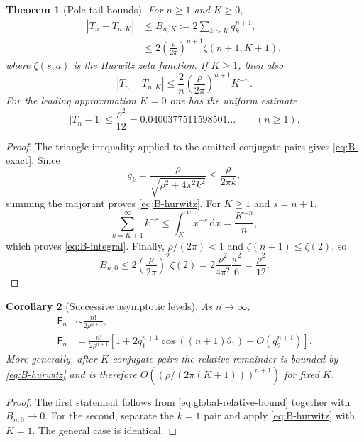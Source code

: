 \documentclass[11pt,a4paper,oneside]{article}
\newtheorem{theorem}{Theorem}[section]
\newtheorem{corollary}[theorem]{Corollary}
\theoremstyle{definition}
\theoremstyle{remark}
\newcommand{\Fub}{\mathsf{F}}
\newcommand{\dd}{\,\mathrm{d}}
\begin{document}
\begin{theorem}[Pole-tail bounds]\label{thm:pole-tail}
For $n\ge1$ and $K\ge0$,
\begin{align}
 |T_n-T_{n,K}|
 &\le B_{n,K}:=2\sum_{k>K}q_k^{n+1},\label{eq:B-exact}\\
 &\le 2\left(\frac{\rho}{2\pi}\right)^{n+1}
       \zeta(n+1,K+1),\label{eq:B-hurwitz}
\end{align}
where $\zeta(s,a)$ is the Hurwitz zeta function.  If $K\ge1$, then also
\begin{equation}\label{eq:B-integral}
 |T_n-T_{n,K}|
 \le \frac{2}{n}\left(\frac{\rho}{2\pi}\right)^{n+1}K^{-n}.
\end{equation}
For the leading approximation $K=0$ one has the uniform estimate
\begin{equation}\label{eq:global-relative-bound}
 |T_n-1|\le\frac{\rho^2}{12}=0.0400377511598501\ldots
 \qquad(n\ge1).
\end{equation}
\end{theorem}

\begin{proof}
The triangle inequality applied to the omitted conjugate pairs gives
\cref{eq:B-exact}.  Since
\[
 q_k=\frac{\rho}{\sqrt{\rho^2+4\pi^2k^2}}
 \le\frac{\rho}{2\pi k},
\]
summing the majorant proves \cref{eq:B-hurwitz}.  For $K\ge1$ and $s=n+1$,
\[
 \sum_{k=K+1}^{\infty}k^{-s}
 \le\int_K^\infty x^{-s}\dd x=\frac{K^{-n}}{n},
\]
which proves \cref{eq:B-integral}.  Finally,
$\rho/(2\pi)<1$ and $\zeta(n+1)\le\zeta(2)$, so
\[
 B_{n,0}
 \le2\left(\frac{\rho}{2\pi}\right)^2\zeta(2)
 =2\frac{\rho^2}{4\pi^2}\frac{\pi^2}{6}
 =\frac{\rho^2}{12}.
\]
\end{proof}

\begin{corollary}[Successive asymptotic levels]\label{cor:successive}
As $n\to\infty$,
\begin{align}
 \Fub_n
 &\sim\frac{n!}{2\rho^{n+1}},\label{eq:leading-asymp}\\
 \Fub_n
 &=\frac{n!}{2\rho^{n+1}}
 \left[1+2q_1^{n+1}\cos((n+1)\theta_1)
 +O(q_2^{n+1})\right].\label{eq:first-correction}
\end{align}
More generally, after $K$ conjugate pairs the relative remainder is bounded by
\cref{eq:B-hurwitz} and is therefore
$O((\rho/(2\pi(K+1)))^{n+1})$ for fixed $K$.
\end{corollary}

\begin{proof}
The first statement follows from \cref{eq:global-relative-bound} together with
$B_{n,0}\to0$.  For the second, separate the $k=1$ pair and apply
\cref{eq:B-hurwitz} with $K=1$.  The general case is identical.
\end{proof}
\end{document}
